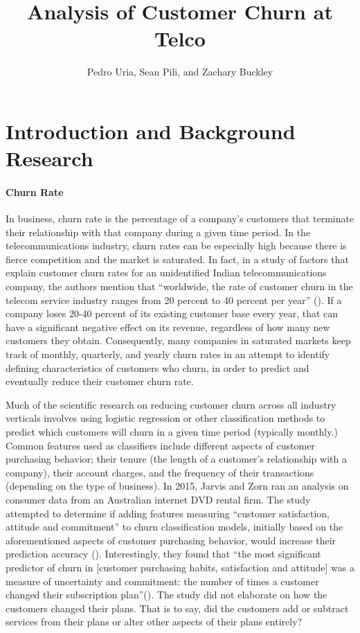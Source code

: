 \documentclass[man, floatsintext]{apa6}
\title{Analysis of Customer Churn at Telco}
\author{Pedro Uria, Sean Pili, and Zachary Buckley}
\affiliation{George Washington University}
\begin{document}
\maketitle

\section{Introduction and Background Research}
\paragraph{Churn Rate}

In business, churn rate is the percentage of a company's customers that terminate their relationship with that company during a given time period. In the telecommunications industry, churn rates can be especially high because there is fierce competition and the market is saturated. In fact, in a study of factors that explain customer churn rates for an unidentified Indian telecommunications company, the authors mention that ``worldwide, the rate of customer churn in the telecom service industry ranges from 20 percent to 40 percent per year'' (\cite[p.~224]{Asamoah_2018}). If a company loses 20-40 percent of its existing customer base every year, that can have a significant negative effect on its revenue, regardless of how many new customers they obtain.  Consequently, many companies in saturated markets keep track of monthly, quarterly, and yearly churn rates in an attempt to identify defining characteristics of customers who churn, in order to predict and eventually reduce their customer churn rate.

Much of the scientific research on reducing customer churn across all industry verticals involves using logistic regression or other classification methods to predict which customers will churn in a given time period (typically monthly.) Common features used as classifiers include different aspects of customer purchasing behavior; their tenure (the length of a customer's relationship with a company), their account charges, and the frequency of their transactions (depending on the type of business). In 2015, Jarvis and Zorn ran an analysis on consumer data from an Australian internet DVD rental firm. The study attempted to determine if adding features measuring ``customer satisfaction, attitude and commitment'' to churn classification models, initially based on the aforementioned aspects of customer purchasing behavior, would increase their prediction accuracy (). Interestingly, they found that ``the most significant predictor of churn in [customer purchasing habits, satisfaction and attitude] was a measure of uncertainty and commitment: the number of times a customer changed their subscription plan''(). The study did not elaborate on how the customers changed their plans. That is to say, did the customers add or subtract services from their plans or alter other aspects of their plans entirely?
\end{document}
